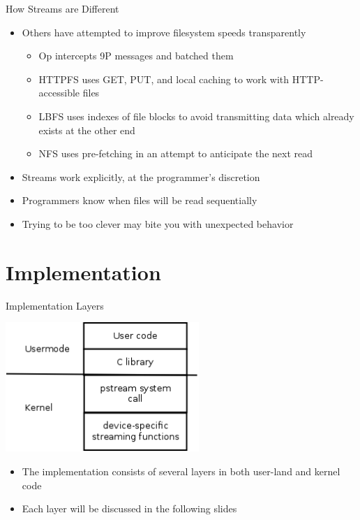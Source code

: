\documentclass[11pt,compress]{beamer}
\begin{document}
\begin{frame}{How Streams are Different}
\begin{itemize}
	\item Others have attempted to improve filesystem speeds transparently
	\begin{itemize}
		\item Op\cite{Op} intercepts 9P messages and batched them
		\item HTTPFS\cite{HTTPFS} uses GET, PUT, and local caching to work with HTTP-accessible files
		\item LBFS\cite{LBFS} uses indexes of file blocks to avoid transmitting data which already exists at the other end
		\item NFS\cite{NFS4} uses pre-fetching in an attempt to anticipate the next read
	\end{itemize}
	\item Streams work explicitly, at the programmer's discretion
	\item Programmers know when files will be read sequentially
	\item Trying to be too clever may bite you with unexpected behavior
\end{itemize}
\end{frame}


\section{Implementation}

\begin{frame}{Implementation Layers}
\begin{center}
	\includegraphics[width=0.55\textwidth]{stack.png}
\end{center}
\begin{itemize}
	\item The implementation consists of several layers in both user-land and kernel code
	\item Each layer will be discussed in the following slides
\end{itemize}
\end{frame}
\end{document}

